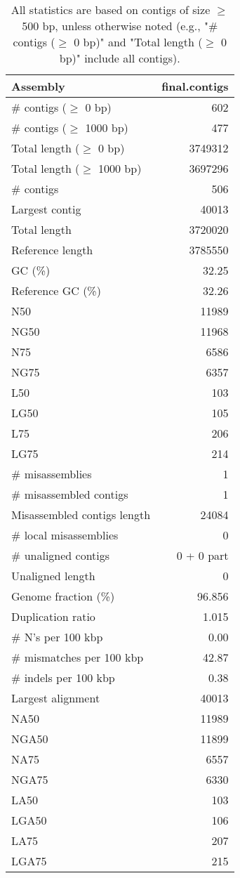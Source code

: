 \documentclass[12pt,a4paper]{article}
\begin{document}
\begin{table}[ht]
\begin{center}
\caption{All statistics are based on contigs of size $\geq$ 500 bp, unless otherwise noted (e.g., "\# contigs ($\geq$ 0 bp)" and "Total length ($\geq$ 0 bp)" include all contigs).}
\begin{tabular}{|l*{1}{|r}|}
\hline
Assembly & final.contigs \\ \hline
\# contigs ($\geq$ 0 bp) & 602 \\ \hline
\# contigs ($\geq$ 1000 bp) & 477 \\ \hline
Total length ($\geq$ 0 bp) & 3749312 \\ \hline
Total length ($\geq$ 1000 bp) & 3697296 \\ \hline
\# contigs & 506 \\ \hline
Largest contig & 40013 \\ \hline
Total length & 3720020 \\ \hline
Reference length & 3785550 \\ \hline
GC (\%) & 32.25 \\ \hline
Reference GC (\%) & 32.26 \\ \hline
N50 & 11989 \\ \hline
NG50 & 11968 \\ \hline
N75 & 6586 \\ \hline
NG75 & 6357 \\ \hline
L50 & 103 \\ \hline
LG50 & 105 \\ \hline
L75 & 206 \\ \hline
LG75 & 214 \\ \hline
\# misassemblies & 1 \\ \hline
\# misassembled contigs & 1 \\ \hline
Misassembled contigs length & 24084 \\ \hline
\# local misassemblies & 0 \\ \hline
\# unaligned contigs & 0 + 0 part \\ \hline
Unaligned length & 0 \\ \hline
Genome fraction (\%) & 96.856 \\ \hline
Duplication ratio & 1.015 \\ \hline
\# N's per 100 kbp & 0.00 \\ \hline
\# mismatches per 100 kbp & 42.87 \\ \hline
\# indels per 100 kbp & 0.38 \\ \hline
Largest alignment & 40013 \\ \hline
NA50 & 11989 \\ \hline
NGA50 & 11899 \\ \hline
NA75 & 6557 \\ \hline
NGA75 & 6330 \\ \hline
LA50 & 103 \\ \hline
LGA50 & 106 \\ \hline
LA75 & 207 \\ \hline
LGA75 & 215 \\ \hline
\end{tabular}
\end{center}
\end{table}
\end{document}
